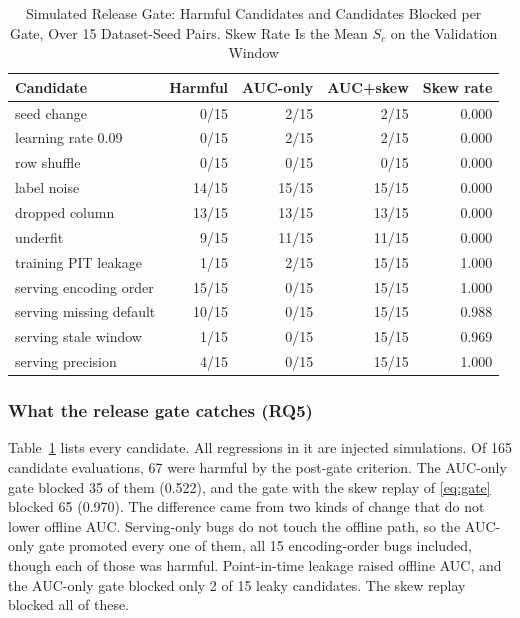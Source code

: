 \documentclass[journal]{IEEEtran}
\begin{document}
\begin{table}[!t]
\caption{Simulated Release Gate: Harmful Candidates and Candidates Blocked per Gate, Over 15 Dataset-Seed Pairs. Skew Rate Is the Mean $S_c$ on the Validation Window}
\label{tab:gate}
\centering
\footnotesize
\setlength{\tabcolsep}{2.5pt}
\begin{tabular}{@{}lrrrr@{}}
\toprule
Candidate & Harmful & AUC-only & AUC+skew & Skew rate \\
\midrule
seed change & 0/15 & 2/15 & 2/15 & 0.000 \\
learning rate 0.09 & 0/15 & 2/15 & 2/15 & 0.000 \\
row shuffle & 0/15 & 0/15 & 0/15 & 0.000 \\
\midrule
label noise & 14/15 & 15/15 & 15/15 & 0.000 \\
dropped column & 13/15 & 13/15 & 13/15 & 0.000 \\
underfit & 9/15 & 11/15 & 11/15 & 0.000 \\
training PIT leakage & 1/15 & 2/15 & 15/15 & 1.000 \\
serving encoding order & 15/15 & 0/15 & 15/15 & 1.000 \\
serving missing default & 10/15 & 0/15 & 15/15 & 0.988 \\
serving stale window & 1/15 & 0/15 & 15/15 & 0.969 \\
serving precision & 4/15 & 0/15 & 15/15 & 1.000 \\
\bottomrule
\end{tabular}
\end{table}

\subsubsection{What the release gate catches (RQ5)}
Table~\ref{tab:gate} lists every candidate. All regressions in it are injected simulations. Of 165 candidate evaluations, 67 were harmful by the post-gate criterion. The AUC-only gate blocked 35 of them (0.522), and the gate with the skew replay of \eqref{eq:gate} blocked 65 (0.970). The difference came from two kinds of change that do not lower offline AUC. Serving-only bugs do not touch the offline path, so the AUC-only gate promoted every one of them, all 15 encoding-order bugs included, though each of those was harmful. Point-in-time leakage raised offline AUC, and the AUC-only gate blocked only 2 of 15 leaky candidates. The skew replay blocked all of these.
\end{document}
